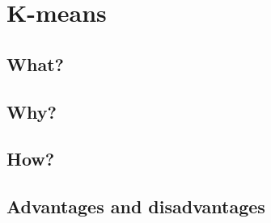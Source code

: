 \section{K-means}

\subsection{What?}

\subsection{Why?}

\subsection{How?}

\subsection{Advantages and disadvantages}

